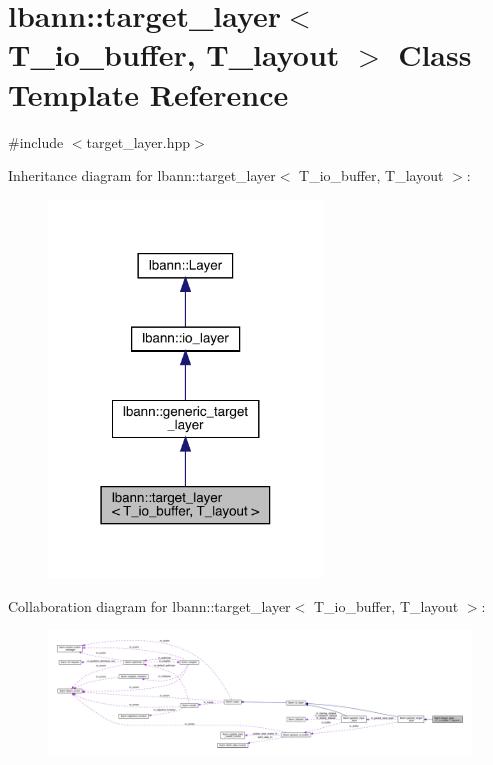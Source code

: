 \hypertarget{classlbann_1_1target__layer}{}\section{lbann\+:\+:target\+\_\+layer$<$ T\+\_\+io\+\_\+buffer, T\+\_\+layout $>$ Class Template Reference}
\label{classlbann_1_1target__layer}


{\ttfamily \#include $<$target\+\_\+layer.\+hpp$>$}



Inheritance diagram for lbann\+:\+:target\+\_\+layer$<$ T\+\_\+io\+\_\+buffer, T\+\_\+layout $>$\+:\nopagebreak
\begin{figure}[H]
\begin{center}
\leavevmode
\includegraphics[width=207pt]{classlbann_1_1target__layer__inherit__graph}
\end{center}
\end{figure}


Collaboration diagram for lbann\+:\+:target\+\_\+layer$<$ T\+\_\+io\+\_\+buffer, T\+\_\+layout $>$\+:\nopagebreak
\begin{figure}[H]
\begin{center}
\leavevmode
\includegraphics[width=350pt]{classlbann_1_1target__layer__coll__graph}
\end{center}
\end{figure}
